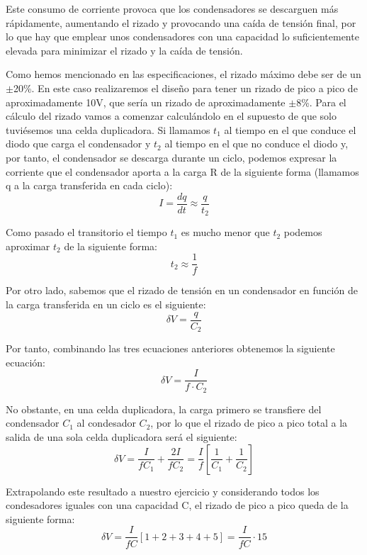 Este consumo de corriente provoca que los condensadores se descarguen más rápidamente, aumentando 
el rizado y provocando una caída de tensión final, por lo que hay que emplear unos condensadores con 
una capacidad lo suficientemente elevada para minimizar el rizado y la caída de tensión.

Como hemos mencionado en las especificaciones, el rizado máximo debe ser de un $\pm$20\%. En este caso 
realizaremos el diseño para tener un rizado de pico a pico de aproximadamente 10V, que sería un 
rizado de aproximadamente $\pm$8\%. Para el cálculo del rizado vamos a comenzar calculándolo 
en el supuesto de que solo tuviésemos una celda duplicadora. Si llamamos $t_1$ al tiempo en el que conduce el diodo que carga 
el condensador y $t_2$ al tiempo en el que no conduce el diodo y, por tanto, el condensador 
se descarga durante un ciclo, podemos expresar la corriente que el condensador aporta a la carga R de la siguiente forma (llamamos 
q a la carga transferida en cada ciclo):
\begin{equation}
    I = \frac{dq}{dt} \approx \frac{q}{t_2}
\end{equation}

Como pasado el transitorio el tiempo $t_1$ es mucho menor que $t_2$ podemos aproximar 
$t_2$ de la siguiente forma:
\begin{equation}
    t_2 \approx \frac{1}{f}
\end{equation}

Por otro lado, sabemos que el rizado de tensión en un condensador en función de la carga transferida 
en un ciclo es el siguiente:
\begin{equation}
    \delta V = \frac{q}{C_2}
\end{equation}

Por tanto, combinando las tres ecuaciones anteriores obtenemos la siguiente ecuación:
\begin{equation}
    \delta V = \frac{I}{f\cdot C_2}
\end{equation}

No obstante, en una celda duplicadora, la carga primero se transfiere del condensador $C_1$ al condesador 
$C_2$, por lo que el rizado de pico a pico total a la salida de una sola celda duplicadora será el siguiente:
\begin{equation}
    \delta V = \frac{I}{fC_1}+\frac{2I}{fC_2} = \frac{I}{f}\left[\frac{1}{C_1}+\frac{1}{C_2}\right]
\end{equation}

Extrapolando este resultado a nuestro ejercicio y considerando todos los condesadores iguales con 
una capacidad C, el rizado de pico a pico queda de la siguiente forma:
\begin{equation}
    \delta V = \frac{I}{fC}[1+2+3+4+5]=\frac{I}{fC}\cdot15
\end{equation}


